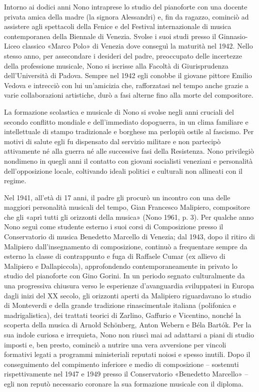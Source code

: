 Intorno ai dodici anni Nono intraprese lo studio del pianoforte con una docente privata amica della madre (la signora Alessandri) e, fin da ragazzo, cominciò ad assistere agli spettacoli della Fenice e del Festival internazionale di musica contemporanea della Biennale di Venezia. Svolse i suoi studi presso il Ginnasio-Liceo classico «Marco Polo» di Venezia dove conseguì la maturità nel 1942. Nello stesso anno, per assecondare i desideri del padre, preoccupato delle incertezze della professione musicale, Nono si iscrisse alla Facoltà di Giurisprudenza dell’Università di Padova. Sempre nel 1942 egli conobbe il giovane pittore Emilio Vedova e intrecciò con lui un’amicizia che, rafforzatasi nel tempo anche grazie a varie collaborazioni artistiche, durò a fasi alterne fino alla morte del compositore.

La formazione scolastica e musicale di Nono si svolse negli anni cruciali del secondo conflitto mondiale e dell’immediato dopoguerra, in un clima familiare e intellettuale di stampo tradizionale e borghese ma perlopiù ostile al fascismo. Per motivi di salute egli fu dispensato dal servizio militare e non partecipò attivamente né alla guerra né alle successive fasi della Resistenza. Nono privilegiò nondimeno in quegli anni il contatto con giovani socialisti veneziani e personalità dell’opposizione locale, coltivando ideali politici e culturali non allineati con il regime.

Nel 1941, all’età di 17 anni, il padre gli procurò un incontro con una delle maggiori personalità musicali del tempo, Gian Francesco Malipiero, compositore che gli «aprì tutti gli orizzonti della musica» (Nono 1961, p. 3). Per qualche anno Nono seguì come studente esterno i suoi corsi di Composizione presso il Conservatorio di musica Benedetto Marcello di Venezia; dal 1943, dopo il ritiro di Malipiero dall’insegnamento di composizione, continuò a frequentare sempre da esterno la classe di contrappunto e fuga di Raffaele Cumar (ex allievo di Malipiero e Dallapiccola), approfondendo contemporaneamente in privato lo studio del pianoforte con Gino Gorini. In un periodo segnato culturalmente da una progressiva chiusura verso le esperienze d’avanguardia sviluppatesi in Europa dagli inizi del XX secolo, gli orizzonti aperti da Malipiero riguardavano lo studio di Monteverdi e della grande tradizione rinascimentale italiana (polifonica e madrigalistica), dei trattati teorici di Zarlino, Gaffurio e Vicentino, nonché la scoperta della musica di Arnold Schönberg, Anton Webern e Béla Bartók. Per la sua indole curiosa e irrequieta, Nono non riuscì mai ad adattarsi a piani di studio imposti e, ben presto, cominciò a nutrire una vera avversione per vincoli formativi legati a programmi ministeriali reputati noiosi e spesso inutili. Dopo il conseguimento del compimento inferiore e medio di composizione – sostenuti rispettivamente nel 1947 e 1949 presso il Conservatorio «Benedetto Marcello» – egli non reputò necessario coronare la sua formazione musicale con il diploma.

